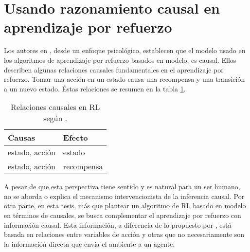 

\section{Usando razonamiento causal en aprendizaje por refuerzo}


Los autores en \cite{Gershman2017}, desde un enfoque psicológico, establecen que el modelo usado en los algoritmos de aprendizaje por refuerzo basados en modelo,
es causal.
Ellos describen algunas relaciones causales fundamentales en el aprendizaje por refuerzo. Tomar una acción en un estado causa una recompensa y una transición a un nuevo estado.
Éstas relaciones se resumen en la tabla \ref{table:causal-relationships}. 

\begin{table}[h]
\centering
\caption{Relaciones causales en RL según \cite{Gershman2017}.}
\label{table:causal-relationships}
\begin{tabular}{@{}ll@{}}
\toprule
Causas         & Efecto     \\ \midrule
estado, acción & estado     \\
estado, acción & recompensa \\ \bottomrule
\end{tabular}
\end{table}

A pesar de que esta perspectiva tiene sentido y es natural para un ser humano, no se aborda o explica el mecanismo intervencionista de la inferencia causal. 
Por otra parte, en esta tesis, más que plantear un algoritmo de RL 
basado en modelo en términos de causales, se
busca complementar el aprendizaje por refuerzo con información causal.
Esta información, a diferencia de lo propuesto por \cite{Gershman2017}, está
basada en relaciones entre variables de acción y otras que no necesariamente son la informacióń directa que envía el ambiente a un agente.



